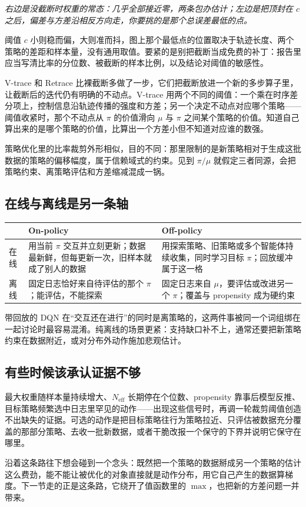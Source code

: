 \emph{右边是没截断时权重的常态：几乎全部接近零，两条包办估计；左边是把顶封在 \(c\) 之后，偏差与方差沿相反方向走，你要挑的是那个总误差最低的点。}

阈值 \(c\) 小则稳而偏，大则准而抖，图上那个最低点的位置取决于轨迹长度、两个策略的差距和样本量，没有通用取值。要紧的是别把截断当成免费的补丁：报告里应当写清比率的分位数、被截断的样本比例，以及结论对阈值的敏感性。

V-trace 和 Retrace 比裸截断多做了一步，它们把截断放进一个新的多步算子里，让截断后的迭代仍有明确的不动点。V-trace 用两个不同的阈值：一个乘在时序差分项上，控制信息沿轨迹传播的强度和方差；另一个决定不动点对应哪个策略——阈值收紧时，那个不动点从 \(\pi\) 的价值滑向 \(\mu\) 与 \(\pi\) 之间某个策略的价值。知道自己算出来的是哪个策略的价值，比算出一个方差小但不知道对应谁的数强。

策略优化里的比率裁剪外形相似，目的不同：那里限制的是新策略相对于生成这批数据的策略的偏移幅度，属于信赖域式的约束。见到 \(\pi/\mu\) 就假定三者同源，会把策略约束、离策略评估和方差缩减混成一锅。

\subsection{在线与离线是另一条轴}

\begin{longtable}{p{}p{}p{}}
\toprule
 & On-policy & Off-policy \\
\midrule
在线 &
用当前 \(\pi\) 交互并立刻更新；数据最新鲜，但每更新一次，旧样本就成了别人的数据 &
用探索策略、旧策略或多个智能体持续收集，同时学习目标 \(\pi\)；回放缓冲属于这一格 \\
离线 &
固定日志恰好来自待评估的那个 \(\pi\)；能评估，不能探索 &
固定日志来自 \(\mu\)，要评估或改进另一个 \(\pi\)；覆盖与 propensity 成为硬约束 \\
\bottomrule
\end{longtable}

带回放的 DQN 在``交互还在进行''的同时是离策略的，这两件事被同一个词组绑在一起讨论时最容易混淆。纯离线的场景更紧：支持缺口补不上，通常还要把新策略约束在数据附近，或对分布外动作施加悲观估计。

\subsection{有些时候该承认证据不够}

最大权重随样本量持续增大、\(N_{\mathrm{eff}}\) 长期停在个位数、propensity 靠事后模型反推、目标策略频繁选中日志里罕见的动作——出现这些信号时，再调一轮裁剪阈值创造不出缺失的证据。可选的动作是把目标策略往行为策略拉近、只评估被数据充分覆盖的那部分策略、去收一批新数据，或者干脆改报一个保守的下界并说明它保守在哪里。

沿着这条路往下想会碰到一个念头：既然把一个策略的数据掰成另一个策略的估计这么费劲，能不能让被优化的对象直接就是动作分布，用它自己产生的数据算梯度。下一节走的正是这条路，它绕开了值函数里的 \(\max\)，也把新的方差问题一并带来。
